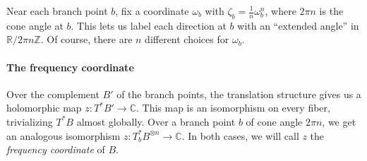 \documentclass{article}
\newcommand{\maps}{\colon}
\newcommand{\Z}{\mathbb{Z}}
\newcommand{\R}{\mathbb{R}}
\newcommand{\C}{\mathbb{C}}
\theoremstyle{definition}
\theoremstyle{plain}
\begin{document}
Near each branch point $b$, fix a coordinate $\omega_b$ with $\zeta_b = \tfrac{1}{n} \omega_b^n$, where $2\pi n$ is the cone angle at $b$. This lets us label each direction at $b$ with an ``extended angle'' in $\R/2\pi n\Z$. Of course, there are $n$ different choices for $\omega_b$.
%
\paragraph{The frequency coordinate}\label{transl-freq}
%
Over the complement $B'$ of the branch points, the translation structure gives us a holomorphic map $z \maps T^*B' \to \C$. This map is an isomorphism on every fiber, trivializing $T^*B$ almost globally. Over a branch point $b$ of cone angle $2\pi n$, we get an analogous isomorphism $z \maps T^*_bB^{\otimes n} \to \C$. In both cases, we will call $z$ the {\em frequency coordinate} of $B$.
\begin{center}
\phaseSpaceLaplace
{}
\end{center}
\end{document}
